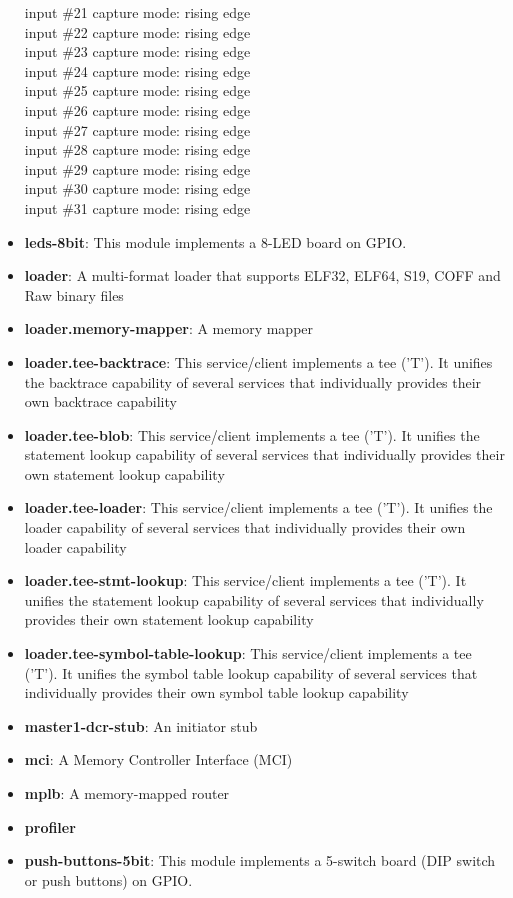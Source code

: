 \begin{itemize}
input \#21 capture mode: rising edge\\
input \#22 capture mode: rising edge\\
input \#23 capture mode: rising edge\\
input \#24 capture mode: rising edge\\
input \#25 capture mode: rising edge\\
input \#26 capture mode: rising edge\\
input \#27 capture mode: rising edge\\
input \#28 capture mode: rising edge\\
input \#29 capture mode: rising edge\\
input \#30 capture mode: rising edge\\
input \#31 capture mode: rising edge\\

\item \textbf{leds-8bit}: This module implements a 8-LED board on GPIO.\\

\item \textbf{loader}: A multi-format loader that supports ELF32, ELF64, S19, COFF and Raw binary files
\item \textbf{loader.memory-mapper}: A memory mapper
\item \textbf{loader.tee-backtrace}: This service/client implements a tee ('T'). It unifies the backtrace capability of several services that individually provides their own backtrace capability
\item \textbf{loader.tee-blob}: This service/client implements a tee ('T'). It unifies the statement lookup capability of several services that individually provides their own statement lookup capability
\item \textbf{loader.tee-loader}: This service/client implements a tee ('T'). It unifies the loader capability of several services that individually provides their own loader capability
\item \textbf{loader.tee-stmt-lookup}: This service/client implements a tee ('T'). It unifies the statement lookup capability of several services that individually provides their own statement lookup capability
\item \textbf{loader.tee-symbol-table-lookup}: This service/client implements a tee ('T'). It unifies the symbol table lookup capability of several services that individually provides their own symbol table lookup capability
\item \textbf{master1-dcr-stub}: An initiator stub
\item \textbf{mci}: A Memory Controller Interface (MCI)
\item \textbf{mplb}: A memory-mapped router
\item \textbf{profiler}
\item \textbf{push-buttons-5bit}: This module implements a 5-switch board (DIP switch or push buttons) on GPIO.\\


\end{itemize}
